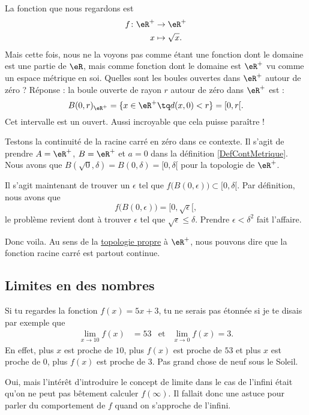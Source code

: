 La fonction que nous regardons est 
\begin{equation}
\begin{aligned}
f \colon \eR^+&\to \eR^+ \\ 
   x&\mapsto \sqrt{x}.
\end{aligned}
\end{equation}
Mais cette fois, nous ne la voyons pas comme étant une fonction dont le domaine est une partie de $\eR$, mais comme fonction dont le domaine est $\eR^+$ vu comme un espace métrique en soi. Quelles sont les boules ouvertes dans $\eR^+$ autour de zéro ? Réponse : la boule ouverte de rayon $r$ autour de zéro dans $\eR^+$ est :
\[ 
  B(0,r)_{\eR^+}=\{ x\in\eR^+\tq d(x,0)<r \}=[0,r[.  
\]
Cet intervalle est un ouvert. Aussi incroyable que cela puisse paraître !

Testons la continuité de la racine carré en zéro dans ce contexte. Il s'agit de prendre $A=\eR^+$, $B=\eR^+$ et $a=0$ dans la définition \ref{DefContMetrique}. Nous avons que $B(\sqrt{0},\delta)=B(0,\delta)=[0,\delta[$ pour la topologie de $\eR^+$.

Il s'agit maintenant de trouver un $\epsilon$ tel que $f\big( B(0,\epsilon) \big)\subset [0,\delta[$. Par définition, nous avons que
\[ 
  f\big( B(0,\epsilon) \big)=[0,\sqrt{\epsilon}[,
\]
le problème revient dont à trouver $\epsilon$ tel que $\sqrt{\epsilon}\leq\delta$. Prendre $\epsilon<\delta^2$ fait l'affaire.


Donc voila. Au sens de la \href{http://fr.wikipedia.org/wiki/Topologie_induite}{topologie propre} à $\eR^+$, nous pouvons dire que la fonction racine carré est partout continue.
\subsection{Limites en des nombres}

Si tu regardes la fonction $f(x)=5x+3$, tu ne serais pas étonnée si je te disais par exemple que 
\begin{align}
\lim_{x\to 10}f(x)&=53&\text{et}&\lim_{x\to 0}f(x)=3.
\end{align}
En effet, plus $x$ est proche de $10$, plus $f(x)$ est proche de $53$ et plus $x$ est proche de $0$, plus $f(x)$ est proche de $3$. Pas grand chose de neuf sous le Soleil.

Oui, mais l'intérêt d'introduire le concept de limite dans le cas de l'infini était qu'on ne peut pas bêtement calculer $f(\infty)$. Il fallait donc une astuce pour parler du comportement de $f$ quand on s'approche de l'infini.

